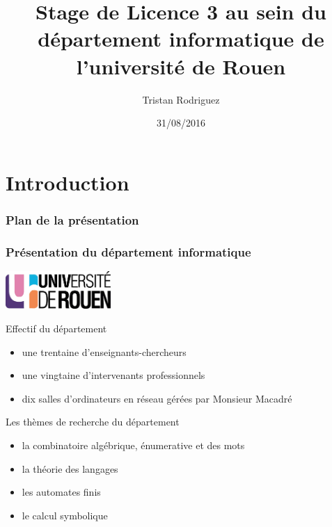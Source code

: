 \documentclass{beamer}
\title{Stage de Licence 3 au sein du département informatique de l’université de Rouen}
\author[Tristan Rodriguez]{Tristan Rodriguez}
\institute{Université de Rouen, L3 Info}
\date{31/08/2016}
\begin{document}
  \section{Introduction}
  \label{sec:Introduction}


  \begin{frame}
    \titlepage
  \end{frame}

  \begin{frame}
    \frametitle{Plan de la présentation}
    \tableofcontents
  \end{frame}

  \begin{frame}
    \frametitle{Présentation du département informatique}
    
    \begin{center}
      \includegraphics[width=0.3\textwidth, height=0.1\textwidth]{logo_univ.png}  
    \end{center}

    \begin{block} {Effectif du département}
      \begin{itemize}
        \item une trentaine d'enseignants-chercheurs
        \item une vingtaine d'intervenants professionnels
        \item dix salles d'ordinateurs en réseau gérées par Monsieur Macadré
      \end{itemize}
    \end{block}
    
    \pause

    \begin{block} {Les thèmes de recherche du département}
      \begin{itemize}
        \item la combinatoire algébrique, énumerative et des mots
        \item la théorie des langages
        \item les automates finis
        \item le calcul symbolique
      \end{itemize}
    \end{block}
  \end{frame}
\end{document}
